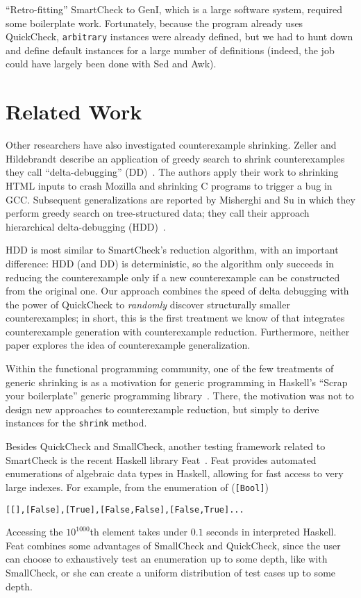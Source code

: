 \documentclass{sigplanconf}
\newenvironment{code}{\begin{alltt}}{\end{alltt}}
\newcommand{\ttp}[1]{\texttt{#1}}
\begin{document}
``Retro-fitting'' SmartCheck to GenI, which is a large software system, required
some boilerplate work.  Fortunately, because the program already uses
QuickCheck, \ttp{arbitrary} instances were already defined, but we had to hunt
down and define default instances for a large number of definitions (indeed, the
job could have largely been done with Sed and Awk).



\section{Related Work}\label{sec:related}

Other researchers have also investigated counterexample shrinking.  Zeller
and Hildebrandt describe an application of greedy search to shrink
counterexamples they call ``delta-debugging'' (DD)~\cite{dd}.  The authors apply
their work to shrinking HTML inputs to crash Mozilla and shrinking C programs to
trigger a bug in GCC.  Subsequent generalizations are reported by Misherghi and
Su in which they perform greedy search on tree-structured data; they call their
approach hierarchical delta-debugging (HDD)~\cite{hdd}.

HDD is most similar to SmartCheck's reduction algorithm, with an important
difference: HDD (and DD) is deterministic, so the algorithm only succeeds in
reducing the counterexample only if a new counterexample can be constructed from
the original one.  Our approach combines the speed of delta debugging with the
power of QuickCheck to \emph{randomly} discover structurally smaller
counterexamples; in short, this is the first treatment we know of that
integrates counterexample generation with counterexample reduction.
Furthermore, neither paper explores the idea of counterexample generalization.

Within the functional programming community, one of the few treatments of
generic shrinking is as a motivation for generic programming in Haskell's
``Scrap your boilerplate'' generic programming library~\cite{syb}.  There, the
motivation was not to design new approaches to counterexample reduction, but
simply to derive instances for the \ttp{shrink} method.

Besides QuickCheck and SmallCheck, another testing framework related to
SmartCheck is the recent Haskell library Feat~\cite{feat}.  Feat provides
automated enumerations of algebraic data types in Haskell, allowing for fast
access to very large indexes.  For example, from the enumeration of
(\ttp{[Bool]})
%
\begin{code}
[[],[False],[True],[False,False],[False,True] ...
\end{code}
%
\noindent
Accessing the $10^{1000}$th element takes under $0.1$ seconds in interpreted
Haskell.  Feat combines some advantages of SmallCheck and QuickCheck, since the
user can choose to exhaustively test an enumeration up to some depth, like with
SmallCheck, or she can create a uniform distribution of test cases up to some
depth.
\end{document}
